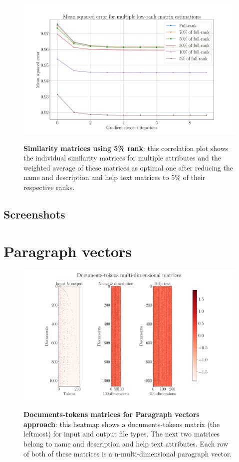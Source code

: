 \begin{figure}[h]
\begin{centering}
    {\includegraphics[scale=0.35]{figures/MSE_iterations_low_rank.pdf}}
    \caption[Similarity matrices 5\% rank]{\textbf{Similarity matrices using 5\% rank}: this correlation plot shows the individual similarity matrices for multiple attributes and the weighted average of these matrices as optimal one after reducing the name and description and help text matrices to 5\% of their respective ranks.}
\end{centering}
\end{figure}


\subsection{Screenshots}

\section{Paragraph vectors}

\begin{figure}[h]
\begin{centering}
    {\includegraphics[scale=0.35]{figures/Documents-tokens_doc2vec.pdf}}
    \caption[Documents-tokens matrices for doc2vec]{\textbf{Documents-tokens matrices for Paragraph vectors approach}: this heatmap shows a documents-tokens matrix (the leftmost) for input and output file types. The next two matrices belong to name and description and help text attributes. Each row of both of these matrices is a n-multi-dimensional paragraph vector.}
\end{centering}
\end{figure}


